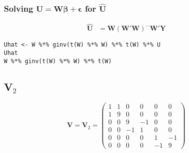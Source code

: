 \documentclass[11pt]{article}
\begin{document}
\subsubsection{Solving $\mathbf{U} = \mathbf{W\beta} + \mathbf{\epsilon}$ for $\hat{\mathbf{U}}$}
\label{sec-2-1-1}


\begin{align*}
\hat{\mathbf{U}} &=
\mathbf{W}(\mathbf{W}'\mathbf{W})^{-}\mathbf{W}'\mathbf{Y}
\end{align*}

\begin{verbatim}
Uhat <- W %*% ginv(t(W) %*% W) %*% t(W) %*% U
Uhat
W %*% ginv(t(W) %*% W) %*% t(W)
\end{verbatim}
\subsubsection{}
\subsection{V$_2$}
\label{sec-2-2}

\[ 
\mathbf{V} = \mathbf{V}_2 = 
\begin{pmatrix}
1 & 1 & 0 & 0 & 0 & 0 \\
1 & 9 & 0 & 0 & 0 & 0 \\
0 & 0 & 9 & -1& 0 & 0 \\
0 & 0 & -1& 1 & 0 & 0 \\
0 & 0 & 0 & 0 & 1 & -1 \\
0 & 0 & 0 & 0 & -1 & 9
\end{pmatrix}
\]
\end{document}
